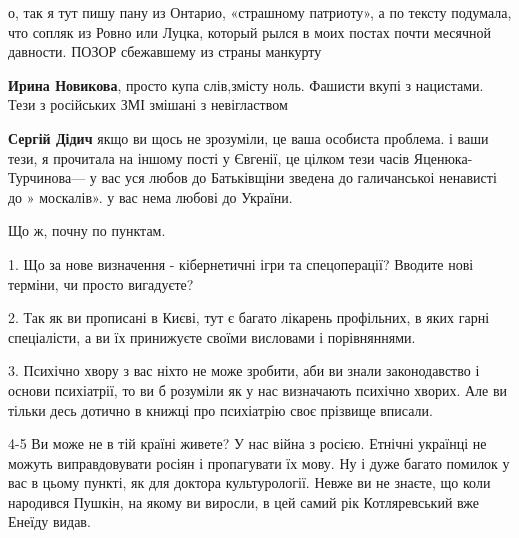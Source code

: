 \begin{itemize}
\begin{itemize}
 

о, так я тут пишу пану из Онтарио, «страшному патриоту», а по тексту подумала,
что сопляк из Ровно или Луцка, который рылся в моих постах почти месячной
давности. ПОЗОР сбежавшему из страны манкурту

 
\textbf{Ирина Новикова}, просто купа слів,змісту ноль. Фашисти вкупі з нацистами. Тези з російських ЗМІ змішані з невіглаством

 

\textbf{Сергій Дідич} якщо ви щось не зрозуміли, це ваша особиста проблема. і ваши тези,
я прочитала на іншому пості у Євгенії, це цілком тези часів Яценюка-Турчинова—
у вас уся любов до Батьківщіни зведена до галичанськоі ненависті до »
москалів». у вас нема любові до України.

\end{itemize}


Що ж, почну по пунктам.

1. Що за нове визначення - кібернетичні ігри та спецоперації? Вводите нові
терміни, чи просто вигадуєте?

2. Так як ви прописані в Києві, тут є багато лікарень профільних, в яких гарні
спеціалісти, а ви їх принижуєте своїми висловами і порівняннями.

3. Психічно хвору з вас ніхто не може зробити, аби ви знали законодавство і
основи психіатрії, то ви б розуміли як у нас визначають психічно хворих. Але ви
тільки десь дотично в книжці про психіатрію своє прізвище вписали.

4-5 Ви може не в тій країні живете? У нас війна з росією. Етнічні українці не
можуть виправдовувати росіян і пропагувати їх мову. Ну і дуже багато помилок у
вас в цьому пункті, як для доктора культурології. Невже ви не знаєте, що коли
народився Пушкін, на якому ви виросли, в цей самий рік Котляревський вже Енеїду
видав.


\end{itemize}
